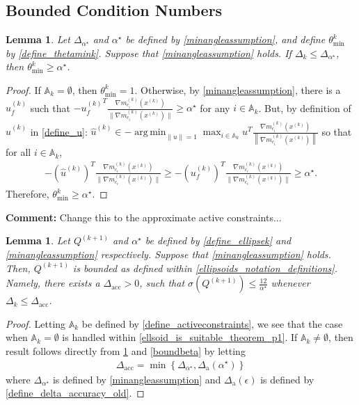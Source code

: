 \documentclass{article}
\newenvironment{comment}
  {\par\medskip
   \color{red}%
   \begin{framed}
   \textbf{Comment: }\ignorespaces}
 {\end{framed}
  \medskip}
\newtheorem{lemma}[theorem]{Lemma}
\theoremstyle{case}
\numberwithin{theorem}{subsection}
\DeclareMathOperator*{\argmin}{arg\,min}
\newcommand{\activeconstraintsk}{{\mathbb A_{k}}}
\newcommand{\dacc}{{\Delta_{\textrm{acc}}}}
\newcommand{\dacco}{{\Delta_{\textrm{a}}}}
\newcommand{\dk}{\Delta_k}
\newcommand{\gmcik}{{\nabla m_{c_i}^{(k)}\left(\xk\right)}}
\newcommand{\huk}{{{\hat u}^{(k)}}}
\newcommand{\minanglealpha}{{ \alpha^{\star} }}
\newcommand{\minangledelta}{{\Delta_{\alpha^{\star}}}}
\newcommand{\thetamink}{{\theta^k_{\textrm{min}}}}
\newcommand{\xk}{{x^{(k)}}}
\newcommand{\qkpo}{{Q^{(k+1)}}}
\newcommand{\minangledirk}{{u^{(k)}_f}}
\begin{document}
\subsection{Bounded Condition Numbers}


\begin{lemma}
\label{theta_min_is_bounded}
Let $\minangledelta$ and $\minanglealpha$ be defined by \cref{minangleassumption}, and
define $\thetamink$ by \cref{define_thetamink}.
Suppose that \cref{minangleassumption} holds.
If $\dk \le \minangledelta$, then $\thetamink \ge \minanglealpha$.
\end{lemma}

\begin{proof}
If $\activeconstraintsk = \emptyset$, then $\thetamink = 1$.
Otherwise, by \cref{minangleassumption}, there is a $\minangledirk$ such that 
$-\minangledirk^T\frac{\gmcik}{\|\gmcik\|} \ge \minanglealpha$ for any $i \in \activeconstraintsk$.
But, by definition of $\huk$ in \cref{define_u}:
$\huk \in -\argmin_{\|u\| = 1} \max_{i \in \activeconstraintsk} u^T\frac{\gmcik}{\left\|\gmcik\right\|}$
so that for all $i \in \activeconstraintsk$,
\begin{align*}
-\left(\huk\right)^T\frac{\gmcik}{\|\gmcik\|}  \ge -\left(\minangledirk\right)^T\frac{\gmcik}{\|\gmcik\|} \ge \minanglealpha.
\end{align*}
Therefore, $\thetamink \ge \minanglealpha$.
\end{proof}

\begin{comment}
Change this to the approximate active constraints...
\end{comment}

\begin{lemma}
\label{bounded_condition_numbers}
Let $\qkpo$ and $\minanglealpha$ be defined by \cref{define_ellipsek} and \cref{minangleassumption} respectively.
Suppose that \cref{minangleassumption} holds.
Then, $\qkpo$ is bounded as defined within \cref{ellipsoids_notation_definitions}.
Namely, there exists a $\dacc > 0$, such that $\sigma(\qkpo) \le \frac {12}{\minanglealpha}$ whenever $\dk \le \dacc$.
\end{lemma}
\begin{proof}
Letting $\activeconstraintsk$ be defined by \cref{define_activeconstraints}, we see that the case when $\activeconstraintsk = \emptyset$ is handled within \cref{ellsoid_is_suitable_theorem_p1}.
If $\activeconstraintsk \ne \emptyset$, then result follows directly from \cref{theta_min_is_bounded} and \cref{boundbeta} by letting
\begin{align}
\dacc = \min\left\{\minangledelta, \dacco(\minanglealpha) \right\} \label{define_delta_accuracy}
\end{align}
where $\minangledelta$ is defined by \cref{minangleassumption} and $\dacco(\epsilon)$ is defined by \cref{define_delta_accuracy_old}.
\end{proof}
\end{document}
